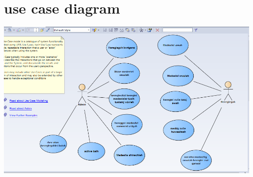 \documentclass[12pt]{article}
\begin{document}
\section{use case diagram}
\includegraphics[width=\textwidth]{Usecase}
\end{document}
